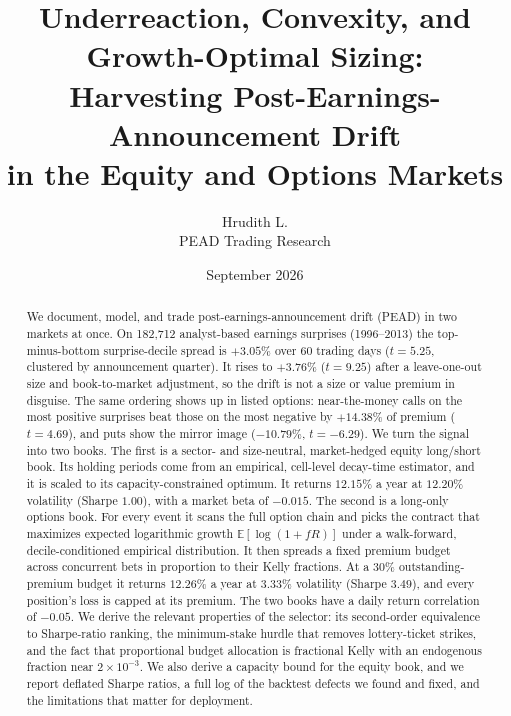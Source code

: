 \documentclass[11pt]{article}
\title{\vspace{-1.2cm}\textbf{Underreaction, Convexity, and Growth-Optimal Sizing:\\[2pt]
Harvesting Post-Earnings-Announcement Drift\\ in the Equity and Options Markets}}
\author{Hrudith L.\\[2pt] \small PEAD Trading Research}
\date{September 2026}
\theoremstyle{definition}
\newcommand{\E}{\mathbb{E}}
\newcommand{\1}{\mathbf{1}}
\begin{document}
\maketitle
\thispagestyle{empty}

\begin{abstract}
\noindent
We document, model, and trade post-earnings-announcement drift (PEAD) in two markets
at once. On 182{,}712 analyst-based earnings surprises (1996--2013) the top-minus-bottom
surprise-decile spread is $+3.05\%$ over 60 trading days ($t=5.25$, clustered by
announcement quarter). It rises to $+3.76\%$ ($t=9.25$) after a leave-one-out size and
book-to-market adjustment, so the drift is not a size or value premium in disguise. The
same ordering shows up in listed options: near-the-money calls on the most positive
surprises beat those on the most negative by $+14.38\%$ of premium ($t=4.69$), and puts
show the mirror image ($-10.79\%$, $t=-6.29$). We turn the signal into two books. The first
is a sector- and size-neutral, market-hedged equity long/short book. Its holding periods
come from an empirical, cell-level decay-time estimator, and it is scaled to its
capacity-constrained optimum. It returns $12.15\%$ a year at $12.20\%$ volatility (Sharpe
$1.00$), with a market beta of $-0.015$. The second is a long-only options book. For every
event it scans the full option chain and picks the contract that maximizes expected
logarithmic growth $\E[\log(1+fR)]$ under a walk-forward, decile-conditioned empirical
distribution. It then spreads a fixed premium budget across concurrent bets in proportion
to their Kelly fractions. At a 30\% outstanding-premium budget it returns $12.26\%$ a year at
$3.33\%$ volatility (Sharpe $3.49$), and every position's loss is capped at its premium. The
two books have a daily return correlation of $-0.05$. We derive the relevant properties of the
selector: its second-order equivalence to Sharpe-ratio ranking, the minimum-stake hurdle
that removes lottery-ticket strikes, and the fact that proportional budget allocation is
fractional Kelly with an endogenous fraction near $2\times10^{-3}$. We also derive a capacity
bound for the equity book, and we report deflated Sharpe ratios, a full log of the backtest
defects we found and fixed, and the limitations that matter for deployment.
\end{abstract}
\end{document}
